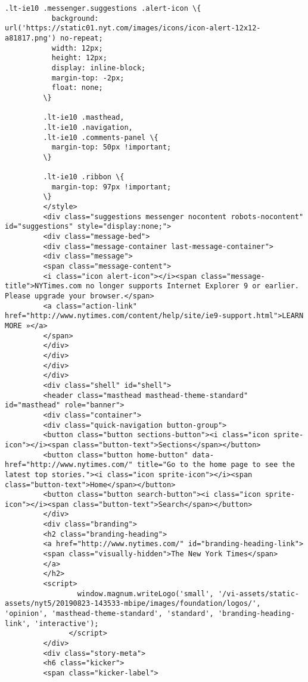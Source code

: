 \documentclass[11pt]{article}
\begin{document}
\begin{Verbatim}[commandchars=\\\{\}]
         .lt-ie10 .messenger.suggestions .alert-icon \{
           background: url('https://static01.nyt.com/images/icons/icon-alert-12x12-a81817.png') no-repeat;
           width: 12px;
           height: 12px;
           display: inline-block;
           margin-top: -2px;
           float: none;
         \}
         
         .lt-ie10 .masthead,
         .lt-ie10 .navigation,
         .lt-ie10 .comments-panel \{
           margin-top: 50px !important;
         \}
         
         .lt-ie10 .ribbon \{
           margin-top: 97px !important;
         \}
         </style>
         <div class="suggestions messenger nocontent robots-nocontent" id="suggestions" style="display:none;">
         <div class="message-bed">
         <div class="message-container last-message-container">
         <div class="message">
         <span class="message-content">
         <i class="icon alert-icon"></i><span class="message-title">NYTimes.com no longer supports Internet Explorer 9 or earlier. Please upgrade your browser.</span>
         <a class="action-link" href="http://www.nytimes.com/content/help/site/ie9-support.html">LEARN MORE »</a>
         </span>
         </div>
         </div>
         </div>
         </div>
         <div class="shell" id="shell">
         <header class="masthead masthead-theme-standard" id="masthead" role="banner">
         <div class="container">
         <div class="quick-navigation button-group">
         <button class="button sections-button"><i class="icon sprite-icon"></i><span class="button-text">Sections</span></button>
         <button class="button home-button" data-href="http://www.nytimes.com/" title="Go to the home page to see the latest top stories."><i class="icon sprite-icon"></i><span class="button-text">Home</span></button>
         <button class="button search-button"><i class="icon sprite-icon"></i><span class="button-text">Search</span></button>
         </div>
         <div class="branding">
         <h2 class="branding-heading">
         <a href="http://www.nytimes.com/" id="branding-heading-link">
         <span class="visually-hidden">The New York Times</span>
         </a>
         </h2>
         <script>
                 window.magnum.writeLogo('small', '/vi-assets/static-assets/nyt5/20190823-143533-mbipe/images/foundation/logos/', 'opinion', 'masthead-theme-standard', 'standard', 'branding-heading-link', 'interactive');
               </script>
         </div>
         <div class="story-meta">
         <h6 class="kicker">
         <span class="kicker-label">

\end{Verbatim}
\end{document}
